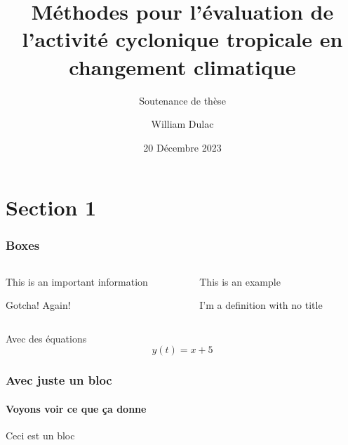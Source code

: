 \documentclass[aspectratio=169, usepdftitle=false, xcolor={dvipsnames}]{beamer}
\title{Méthodes pour l'évaluation de l'activité cyclonique tropicale en changement climatique}
\author[William]{William Dulac}
\subtitle{Soutenance de thèse}
\institute{Centre National de Recherches Météorologiques}
\date{20 Décembre 2023}
\begin{document}
\maketitle

\section{Section 1}

\begin{frame}
	\frametitle{Boxes}
	\begin{columns}[t]
		\begin{column}{0.45\textwidth}
			\begin{block}
				This is an important information
			\end{block}
			\begin{alertblock}[Argh]
				Gotcha!
				\tcblower
				Again!
			\end{alertblock}
		\end{column}
		\begin{column}{0.45\textwidth}
			\begin{examples}[Example 1]
                This is an example
			\end{examples}
			\begin{definition}
				I'm a definition with no title
			\end{definition}
		\end{column}
	\end{columns}
\end{frame}

\begin{frame}{Avec des équations}
    \begin{equation*}
        y(t) = x + 5
    \end{equation*}
\end{frame}

\begin{frame}[c]
    \frametitle{Avec juste un bloc}
    \framesubtitle{Voyons voir ce que ça donne}
    
    \begin{examples}[Test]
       Ceci est un bloc 
    \end{examples}
\end{frame}
\end{document}
